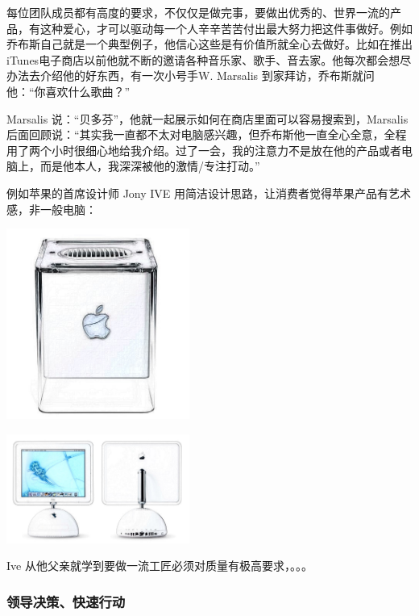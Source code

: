 每位团队成员都有高度的要求，不仅仅是做完事，要做出优秀的、世界一流的产品，有这种爱心，才可以驱动每一个人辛辛苦苦付出最大努力把这件事做好。例如乔布斯自己就是一个典型例子，他信心这些是有价值所就全心去做好。比如在推出iTunes电子商店以前他就不断的邀请各种音乐家、歌手、音去家。他每次都会想尽办法去介绍他的好东西，有一次小号手W.
Marsalis 到家拜访，乔布斯就问他：``你喜欢什么歌曲？''

Marsalis
说：``贝多芬''，他就一起展示如何在商店里面可以容易搜索到，Marsalis后面回顾说：``其实我一直都不太对电脑感兴趣，但乔布斯他一直全心全意，全程用了两个小时很细心地给我介绍。过了一会，我的注意力不是放在他的产品或者电脑上，而是他本人，我深深被他的激情/专注打动。''

例如苹果的首席设计师 Jony IVE
用简洁设计思路，让消费者觉得苹果产品有艺术感，非一般电脑：


\includegraphics[width=6cm]{Power_Mac_Screenshot_2023-07-05_131914_副本.jpg}


\includegraphics[width=6cm]{R-C_副本.jpg}

Ive 从他父亲就学到要做一流工匠必须对质量有极高要求，。。。

\hypertarget{ux9886ux5bfcux51b3ux7b56ux5febux901fux884cux52a8}{%
\subsubsection{领导决策、快速行动}\label{ux9886ux5bfcux51b3ux7b56ux5febux901fux884cux52a8}}

